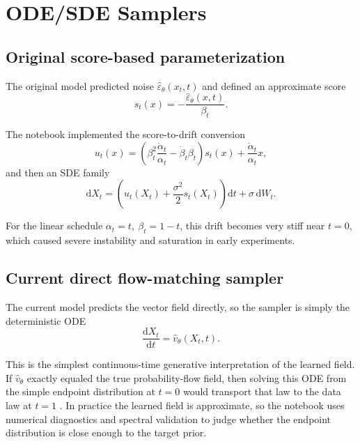 \documentclass[11pt]{article}
\newcommand{\e}{\varepsilon}
\newcommand{\dd}{\mathrm{d}}
\begin{document}
\section{ODE/SDE Samplers}

\subsection{Original score-based parameterization}

The original model predicted noise \(\hat\e_\theta(x_t,t)\) and defined an approximate score
\begin{equation}
  s_t(x) = -\frac{\hat\e_\theta(x,t)}{\beta_t}.
\end{equation}

The notebook implemented the score-to-drift conversion
\begin{equation}
  u_t(x)
  =
  \left(
    \beta_t^2 \frac{\dot\alpha_t}{\alpha_t}
    -
    \dot\beta_t \beta_t
  \right) s_t(x)
  +
  \frac{\dot\alpha_t}{\alpha_t}x,
\end{equation}
and then an SDE family
\begin{equation}
  \dd X_t
  =
  \left(
    u_t(X_t) + \frac{\sigma^2}{2}s_t(X_t)
  \right)\dd t
  +
  \sigma\,\dd W_t.
\end{equation}

For the linear schedule \(\alpha_t=t,\ \beta_t=1-t\), this drift becomes very stiff near \(t=0\), which caused severe instability and saturation in early experiments.

\subsection{Current direct flow-matching sampler}

The current model predicts the vector field directly, so the sampler is simply the deterministic ODE
\begin{equation}
  \frac{\dd X_t}{\dd t} = \hat v_\theta(X_t,t).
\end{equation}

This is the simplest continuous-time generative interpretation of the learned field. If \(\hat v_\theta\) exactly equaled the true probability-flow field, then solving this ODE from the simple endpoint distribution at \(t=0\) would transport that law to the data law at \(t=1\) \cite{lipman2023flowmatching}. In practice the learned field is approximate, so the notebook uses numerical diagnostics and spectral validation to judge whether the endpoint distribution is close enough to the target prior.
\end{document}
